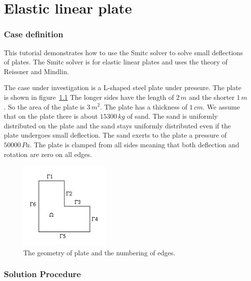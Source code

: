 \chapter{Elastic linear plate}


\subsection*{Case definition}

This tutorial demonstrates how to use the Smitc solver to solve
small deflections of plates.
The Smitc solver is for elastic linear plates and
uses the theory of Reissner and Mindlin.

The case under investigation is a L-shaped steel plate under pressure.
The plate is shown in figure~\ref{fig:simplePlate}
The longer sides have the length of $2\,m$ and the shorter $1\,m$. 
So the area of the plate is $3\,m^2$. The plate has a thickness of
$1\,cm$. We assume that on the plate
there is about $15300\,kg$ of sand. The sand is uniformly distributed
on the plate and the sand stays uniformly distributed even if the 
plate undergoes small deflection. The sand exerts to the plate
a pressure of $50000\,Pa$. The plate is clamped from all sides
meaning that both deflection and rotation are zero on all edges.
%
\begin{figure}[tbhp]
\begin{center}
\includegraphics[width=0.4\textwidth]{simplePlate}
\end{center}
\caption{The geometry of plate and the numbering of edges.}
\label{fig:simplePlate}
\end{figure}

\subsection*{Solution Procedure}

